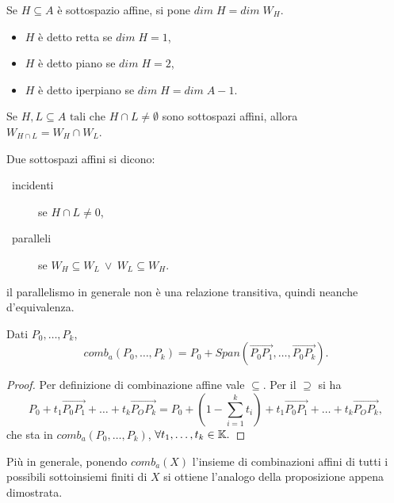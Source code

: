 \documentclass[a4paper,12pt]{article}
\newcommand{\Got}[1]{#1}
\newcommand{\got}[1]{{#1}}
\newcommand{\vet}[1]{\overrightarrow{#1}}
\begin{document}
 \begin{definition}
 \Got{Se} $\got{H\subseteq A}$ \Got{è sottospazio affine, si pone} $\got{dim\;H=dim\;W_{H}}$.
 \begin{itemize}
	\item $\got{H}$ \Got{è detto retta se} $\got{dim\;H = 1}$,
	\item $\got{H}$ \Got{è detto piano se} $\got{dim\;H = 2}$,
	\item $\got{H}$ \Got{è detto iperpiano se} $\got{dim\;H = dim\;A-1}$.
 \end{itemize}
 \end{definition}
 
 \begin{remark}
 \Got{Se} $\got{H, L \subseteq A \text{ tali che } H\cap L \neq \emptyset}$ \Got{sono sottospazi affini, allora}\\
 $\got{W_{H\cap L}=W_H\cap W_L}$.
 \end{remark}
 
 \begin{definition}
 \Got{Due sottospazi affini si dicono:}
 \begin{description}
	\item[\textbullet\ incidenti] \Got{se} $\got{H\cap L \neq 0}$,
	\item[\textbullet\ paralleli] \Got{se} $\got{W_H\subseteq W_L\ \vee\ W_L\subseteq W_H}$.
 \end{description}
 \end{definition}
 
 \begin{remark}
 \Got{il parallelismo in generale non è una relazione transitiva, quindi neanche d'equivalenza.}
 \end{remark}

 \begin{proposition}
 \Got{Dati} $\got{P_0,\dots,P_k}$,
 \[
	\got{comb_a(P_0,\dots,P_k)= P_0+Span}(\vet{P_0P_1},\dots,\vet{P_0P_k}).
 \]
 \end{proposition}
 
 \begin{proof}
 \Got{Per definizione di combinazione affine vale} $\got{\subseteq}$. \Got{Per il} $\got{\supseteq}$ \Got{si ha}
 \[
	\got{P_0+t_1\vet{P_0P_1}+\dots+t_k\vet{P_OP_k} 
		=P_0+\left(1-\sum_{i=1}^{k}t_i\right)+t_1\vet{P_0P_1}+\dots+t_k\vet{P_OP_k}},
 \]
 \Got{che sta in} $\got{comb_a(P_0,\dots,P_k)}$, $\got{\forall t_1,\dots,t_k\in \K}.$
 \end{proof}
 
 \Got{Più in generale, ponendo} $\got{comb_a(X)}$ \Got{l'insieme di combinazioni affini di tutti i possibili sottoinsiemi finiti di} $\got{X}$
 \Got{si ottiene l'analogo della proposizione appena dimostrata.}
 
\end{document}
